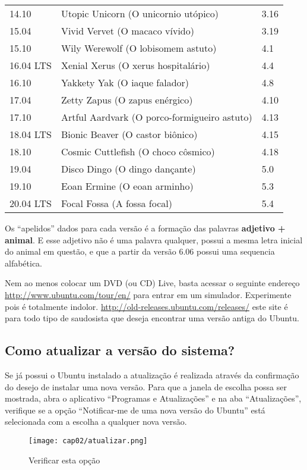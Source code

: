 \begin{center}
\begin{longtable}[h!]{l|l|l}
  14.10 & Utopic Unicorn (O unicornio utópico) & 3.16 \\
  15.04 & Vivid Vervet (O macaco vívido) & 3.19 \\
  15.10 & Wily Werewolf (O lobisomem astuto) & 4.1 \\
  16.04 LTS & Xenial Xerus (O xerus hospitalário) & 4.4 \\
  16.10 & Yakkety Yak (O iaque falador) & 4.8 \\
  17.04 & Zetty Zapus (O zapus enérgico) & 4.10 \\
  17.10 & Artful Aardvark (O porco-formigueiro astuto) & 4.13 \\
  18.04 LTS & Bionic Beaver (O castor biônico) & 4.15 \\
  18.10 & Cosmic Cuttlefish (O choco côsmico) & 4.18 \\
  19.04 & Disco Dingo (O dingo dançante) & 5.0 \\
  19.10 & Eoan Ermine (O eoan arminho) & 5.3 \\
  20.04 LTS & Focal Fossa (A fossa focal) & 5.4
 \end{longtable}
\end{center}\vspace{-3em}

Os ``apelidos'' dados para cada versão é a formação das palavras \textbf{adjetivo + animal}. E esse adjetivo não é uma palavra qualquer, possui a mesma letra inicial do animal em questão, e que a partir da versão 6.06 possui uma sequencia alfabética.
\\[3mm]
\begin{dica}
	Nem ao menos colocar um DVD (ou CD) Live, basta acessar o seguinte endereço \url{http://www.ubuntu.com/tour/en/} para entrar em um simulador. Experimente pois é totalmente indolor. \url{http://old-releases.ubuntu.com/releases/} este site é para todo tipo de saudosista que deseja encontrar uma versão antiga do Ubuntu.
\end{dica}

\subsection{Como atualizar a versão do sistema?}
Se já possui o Ubuntu instalado a atualização é realizada através da confirmação do desejo de instalar uma nova versão. Para que a janela de escolha possa ser mostrada, abra o aplicativo “Programas e Atualizações” e na aba “Atualizações”, verifique se a opção “Notificar-me de uma nova versão do Ubuntu” está selecionada com a escolha a qualquer nova versão.
\begin{figure}[H]
 \centering\texttt{[image: cap02/atualizar.png]}
 \caption{Verificar esta opção}
 \end{figure}

